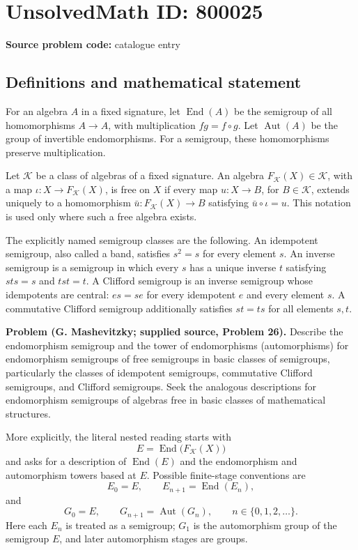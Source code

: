 \documentclass[11pt]{article}
\begin{document}
\section*{UnsolvedMath ID: 800025}
\textbf{Source problem code:} catalogue entry
\subsection{Definitions and mathematical statement}
For an algebra \(A\) in a fixed signature, let \(\operatorname{End}(A)\) be the semigroup of all homomorphisms \(A\to A\), with multiplication \(fg=f\circ g\). Let \(\operatorname{Aut}(A)\) be the group of invertible endomorphisms. For a semigroup, these homomorphisms preserve multiplication.

Let \(\mathcal K\) be a class of algebras of a fixed signature. An algebra \(F_{\mathcal K}(X)\in\mathcal K\), with a map \(\iota:X\to F_{\mathcal K}(X)\), is free on \(X\) if every map \(u:X\to B\), for \(B\in\mathcal K\), extends uniquely to a homomorphism \(\bar u:F_{\mathcal K}(X)\to B\) satisfying \(\bar u\circ\iota=u\). This notation is used only where such a free algebra exists.

The explicitly named semigroup classes are the following. An idempotent semigroup, also called a band, satisfies \(s^2=s\) for every element \(s\). An inverse semigroup is a semigroup in which every \(s\) has a unique inverse \(t\) satisfying \(sts=s\) and \(tst=t\). A Clifford semigroup is an inverse semigroup whose idempotents are central: \(es=se\) for every idempotent \(e\) and every element \(s\). A commutative Clifford semigroup additionally satisfies \(st=ts\) for all elements \(s,t\).

\textbf{Problem (G. Mashevitzky; supplied source, Problem 26).} Describe the endomorphism semigroup and the tower of endomorphisms (automorphisms) for endomorphism semigroups of free semigroups in basic classes of semigroups, particularly the classes of idempotent semigroups, commutative Clifford semigroups, and Clifford semigroups. Seek the analogous descriptions for endomorphism semigroups of algebras free in basic classes of mathematical structures.

More explicitly, the literal nested reading starts with
\[
E=\operatorname{End}\bigl(F_{\mathcal K}(X)\bigr)
\]
and asks for a description of \(\operatorname{End}(E)\) and the endomorphism and automorphism towers based at \(E\). Possible finite-stage conventions are
\[
E_0=E,\qquad E_{n+1}=\operatorname{End}(E_n),
\]
and
\[
G_0=E,\qquad G_{n+1}=\operatorname{Aut}(G_n),
\qquad n\in\{0,1,2,\ldots\}.
\]
Here each \(E_n\) is treated as a semigroup; \(G_1\) is the automorphism group of the semigroup \(E\), and later automorphism stages are groups.
\end{document}
